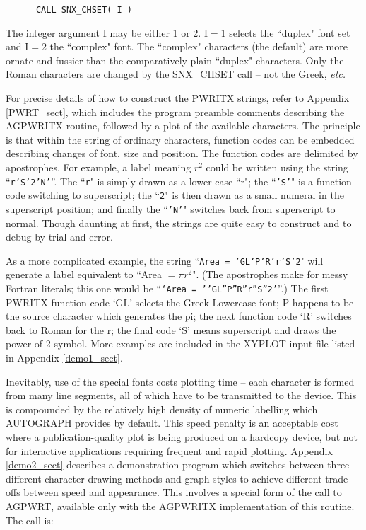 \begin{verbatim}
      CALL SNX_CHSET( I )
\end{verbatim}

The integer argument I may be either 1 or 2.
I$=$1 selects the ``duplex" font set and I$=$2 the ``complex" font.
The ``complex" characters (the default) are more ornate and
fussier than the comparatively plain ``duplex" characters.
Only the Roman characters are changed by the SNX\_CHSET call --
not the Greek, {\em etc.}

For precise details of how to construct the PWRITX strings, refer to Appendix
\ref{PWRT_sect}, which includes the program preamble comments describing the
AGPWRITX routine, followed by a plot of the available characters.
The principle is that within the string of ordinary characters, function codes
can be embedded describing changes of font, size and position.
The function codes are delimited by apostrophes.
For example, a label meaning $r^{2}$ could be written using the string
``{\tt r'S'2'N'}''.
The ``{\tt r}" is simply drawn as a lower case ``r"; the ``{\tt 'S'}" is a
function code switching to superscript; the ``{\tt 2}" is then drawn as a small
numeral in the superscript position; and finally the ``{\tt 'N'}" switches back
from superscript to normal.
Though daunting at first, the strings are quite easy to construct and to debug
by trial and error.

As a more complicated
example, the string ``{\tt Area = 'GL'P'R'r'S'2}" will generate a label
equivalent to ``Area $=\pi r^{2}$".
(The apostrophes make for messy Fortran literals; this one would be
``{\tt `Area = ''GL''P''R''r''S''2'}''.)
The first PWRITX function code `GL' selects the Greek Lowercase
font;  P happens to be the source character which generates the
pi;  the next function code `R' switches back to Roman for the
r;  the final code `S' means superscript and draws the power of 2 symbol.
More examples are included in the XYPLOT input file listed in Appendix
\ref{demo1_sect}.

Inevitably, use of the special fonts costs plotting time -- each
character is formed from many line segments, all of which have
to be transmitted to the device.
This is compounded by the relatively high density of
numeric labelling which AUTOGRAPH provides by default.
This speed penalty is an acceptable cost where a publication-quality
plot is being produced on a hardcopy device, but not for
interactive applications requiring frequent and rapid plotting.
Appendix \ref{demo2_sect} describes a demonstration program which
switches between three different character drawing
methods and graph styles to achieve different trade-offs
between speed and appearance.
This involves a special form of the call to AGPWRT, available
only with the AGPWRITX implementation of this routine.
The call is:

